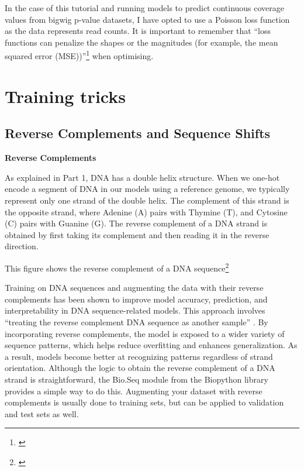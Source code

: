 \documentclass[
]{book}
\begin{document}
In the case of this tutorial and running models to predict continuous coverage values from bigwig p-value datasets, I have opted to use a Poisson loss function as the data represents read counts. It is important to remember that ``loss functions can penalize the shapes or the magnitudes (for example, the mean squared error (MSE))''\footnote{\citet{toneyan2022}} when optimising.

\chapter{Training tricks}\label{training-tricks}

\section{Reverse Complements and Sequence Shifts}\label{reverse-complements-and-sequence-shifts}

\textbf{Reverse Complements}

As explained in Part 1, DNA has a double helix structure. When we one-hot encode a segment of DNA in our models using a reference genome, we typically represent only one strand of the double helix. The complement of this strand is the opposite strand, where Adenine (A) pairs with Thymine (T), and Cytosine (C) pairs with Guanine (G). The reverse complement of a DNA strand is obtained by first taking its complement and then reading it in the reverse direction.

This figure shows the reverse complement of a DNA sequence\footnote{\citet{clark2021}}

Training on DNA sequences and augmenting the data with their reverse complements has been shown to improve model accuracy, prediction, and interpretability in DNA sequence-related models. This approach involves ``treating the reverse complement DNA sequence as another sample'' \citep{cao2019}. By incorporating reverse complements, the model is exposed to a wider variety of sequence patterns, which helps reduce overfitting and enhances generalization. As a result, models become better at recognizing patterns regardless of strand orientation. Although the logic to obtain the reverse complement of a DNA strand is straightforward, the Bio.Seq module from the Biopython library provides a simple way to do this. Augmenting your dataset with reverse complements is usually done to training sets, but can be applied to validation and test sets as well.
\end{document}
